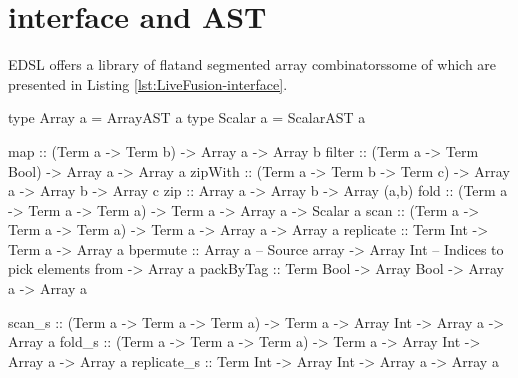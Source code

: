 \documentclass[preamble.tex]{subfiles}
\begin{document}



\section{\LiveFusion interface and AST}
\label{sec:AST}

\LiveFusion EDSL offers a library of flat\iflatcomb and segmented array combinators\isegcomb some of which are presented in Listing \ref{lst:LiveFusion-interface}.

\begin{hscode2}[%
    caption={\LiveFusion interface functions. Typeclass constraints on array elements have been omitted for brevity.},%
    label=lst:LiveFusion-interface,%
]
type Array  a = ArrayAST  a
type Scalar a = ScalarAST a

map      :: (Term a -> Term b) -> Array a -> Array b
filter   :: (Term a -> Term Bool) -> Array a -> Array a
zipWith  :: (Term a -> Term b -> Term c) -> Array a -> Array b -> Array c
zip      :: Array a -> Array b -> Array (a,b)
fold     :: (Term a -> Term a -> Term a) -> Term a -> Array a -> Scalar a
scan     :: (Term a -> Term a -> Term a) -> Term a -> Array a -> Array a
replicate :: Term Int -> Term a -> Array a
bpermute :: Array a      -- Source array
         -> Array Int    -- Indices to pick elements from
         -> Array a
packByTag :: Term Bool -> Array Bool -> Array a -> Array a

scan_s   :: (Term a -> Term a -> Term a) -> Term a
         -> Array Int -> Array a -> Array a
fold_s   :: (Term a -> Term a -> Term a) -> Term a
         -> Array Int -> Array a -> Array a
replicate_s :: Term Int -> Array Int -> Array a -> Array a
\end{hscode2}
\end{document}
